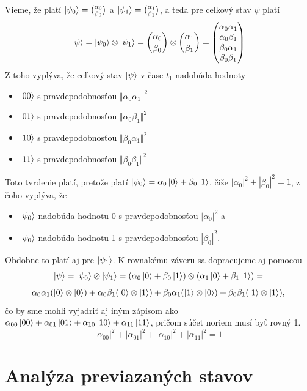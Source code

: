 Vieme, že platí \(\ket{\psi_0} = \binom{\alpha_0}{\beta_0}\) a  
\(\ket{\psi_1} = \binom{\alpha_1}{\beta_1}\), a teda pre celkový stav \(\psi\) 
platí 
\[
\ket{\psi} = \ket{\psi_0} \otimes \ket{\psi_1} = \binom{\alpha_0}{\beta_0}
\otimes \binom{\alpha_1}{\beta_1} = 
\begin{pmatrix}
    \alpha_0\alpha_1 \\
    \alpha_0\beta_1 \\
    \beta_0\alpha_1 \\
    \beta_0\beta_1
\end{pmatrix}
\]
Z toho vyplýva, že celkový stav \(\ket{\psi}\) v čase \(t_1\) nadobúda 
hodnoty
\begin{itemize}
    \item[] \(\ket{00}\) s pravdepodobnosťou \(\Vert \alpha_0\alpha_1 \Vert^2\)
    \item[] \(\ket{01}\) s pravdepodobnosťou \(\Vert \alpha_0\beta_1 \Vert^2\)
    \item[] \(\ket{10}\) s pravdepodobnosťou \(\Vert \beta_0\alpha_1 \Vert^2\)
    \item[] \(\ket{11}\) s pravdepodobnosťou \(\Vert \beta_0\beta_1 \Vert^2\)
\end{itemize}

Toto tvrdenie platí, pretože platí 
\(\ket{\psi_0} = \alpha_0\ket{0} + \beta_0\ket{1}\), čiže 
\(|\alpha_0|^2 + |\beta_0|^2 = 1\), z čoho vyplýva, že 
\begin{itemize}
    \item[] \(\ket{\psi_0}\) nadobúda hodnotu 0 s 
pravdepodobnosťou \(|\alpha_0|^2\) a 
    \item[] \(\ket{\psi_0}\) nadobúda hodnotu 1 s 
pravdepodobnosťou \(|\beta_0|^2\).
\end{itemize}
Obdobne to platí aj pre \(\ket{\psi_1}\). K rovnakému záveru sa dopracujeme
aj pomocou 
\[\ket{\psi} = \ket{\psi_0} \otimes \ket{\psi_1} = 
(\alpha_0\ket{0} + \beta_0\ket{1}) \otimes  (\alpha_1\ket{0} + \beta_1\ket{1}) =
\]
\[
\alpha_0\alpha_1 (\ket{0} \otimes \ket{0}) +  
\alpha_0\beta_1 (\ket{0} \otimes \ket{1}) + 
\beta_0\alpha_1 (\ket{1} \otimes \ket{0}) + 
\beta_0\beta_1 (\ket{1} \otimes \ket{1}), 
\]
čo by sme mohli vyjadriť aj iným zápisom ako 
\(
\alpha_{00}\ket{00} + \alpha_{01}\ket{01} + 
\alpha_{10}\ket{10} + \alpha_{11}\ket{11}
\), pričom súčet noriem musí byť rovný 1.
\[
|\alpha_{00}|^2 + |\alpha_{01}|^2 + |\alpha_{10}|^2 + |\alpha_{11}|^2 = 1\]

\section{Analýza previazaných stavov}

